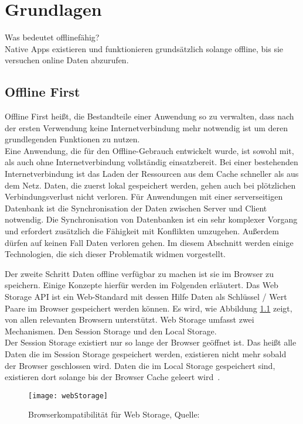 \chapter{\label{chap:grundlagen}Grundlagen}
Was bedeutet offlinefähig?\\
Native \Glspl{App} existieren und funktionieren grundsätzlich solange offline, bis sie versuchen online Daten abzurufen.
%
%
\section{Offline First}
Offline First heißt, die Bestandteile einer Anwendung so zu verwalten, dass nach der ersten Verwendung keine Internetverbindung mehr notwendig ist um deren grundlegenden Funktionen zu nutzen.\\
Eine Anwendung, die für den Offline-Gebrauch entwickelt wurde, ist sowohl mit, als auch ohne Internetverbindung vollständig einsatzbereit. Bei einer bestehenden Internetverbindung ist das Laden der Ressourcen aus dem Cache schneller als aus dem Netz. Daten, die zuerst lokal gespeichert werden, gehen auch bei plötzlichen Verbindungsverlust nicht verloren.
Für Anwendungen mit einer serverseitigen Datenbank ist die Synchronisation der Daten zwischen Server und Client notwendig. Die Synchronisation von Datenbanken ist ein sehr komplexer Vorgang und erfordert zusätzlich die Fähigkeit mit Konflikten umzugehen. Außerdem dürfen auf keinen Fall Daten verloren gehen. Im diesem Abschnitt werden einige Technologien, die sich dieser Problematik widmen vorgestellt.
%
%

%
%
%
Der zweite Schritt Daten offline verfügbar zu machen ist sie im Browser zu speichern. Einige Konzepte hierfür werden im Folgenden erläutert.
%
Das Web Storage \gls{API} ist ein Web-Standard mit dessen Hilfe Daten als Schlüssel / Wert Paare im Browser gespeichert werden können. Es wird, wie Abbildung \ref{fig:webStorage} zeigt, von allen relevanten Browsern unterstützt.
Web Storage umfasst zwei Mechanismen. Den Session Storage und den Local Storage.\\
Der Session Storage existiert nur so lange der Browser geöffnet ist.
Das heißt alle Daten die im Session Storage gespeichert werden, existieren nicht mehr sobald der Browser geschlossen wird. Daten die im Local Storage gespeichert sind, existieren dort solange bis der Browser Cache geleert wird~\cite{webstorage}.
\begin{figure}[H]
	\centering
	\texttt{[image: webStorage]}
	\grayRule
	\caption{Browserkompatibilität für Web Storage, Quelle: ~\cite{caniuse-ws}}
	\label{fig:webStorage}
\end{figure}
